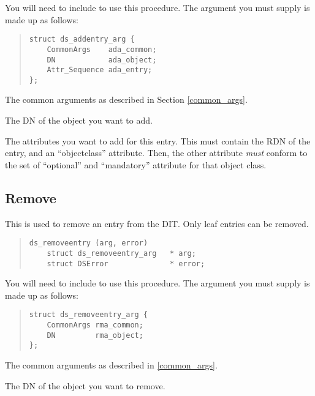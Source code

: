 You will need to include  to use this procedure.
The argument you must supply is made up as follows:

\begin{quote}\small\begin{verbatim}
struct ds_addentry_arg {
    CommonArgs    ada_common;
    DN            ada_object;
    Attr_Sequence ada_entry;
};
\end{verbatim}\end{quote}


\begin{describe}
\item [\verb"ada\_common":] The common arguments as described in Section
\ref{common_args}.
\item [\verb"ada\_object":] The DN of the object you want to add.
\item [\verb"ada\_entry":] The attributes you want to add for this entry.
This must contain the RDN of the entry, and an ``objectclass'' attribute.
Then, the other attribute {\em must} conform to the set of ``optional'' and
``mandatory'' attribute for that object class.
\end{describe}


\subsection {Remove}

This is used to remove an entry from the DIT.
Only leaf entries can be removed.

\begin{quote}\small\begin{verbatim}
ds_removeentry (arg, error)
    struct ds_removeentry_arg   * arg;    
    struct DSError              * error;
\end{verbatim}\end{quote}

You will need to include  to use this procedure.
The argument you must supply is made up as follows:

\begin{quote}\small\begin{verbatim}
struct ds_removeentry_arg {
    CommonArgs rma_common;
    DN         rma_object;
};
\end{verbatim}\end{quote}

\begin{describe}
\item [\verb"rma\_common":] The common arguments as described in
\ref{common_args}.
\item [\verb"rma\_object":] The DN of the object you want to remove.
\end{describe}


